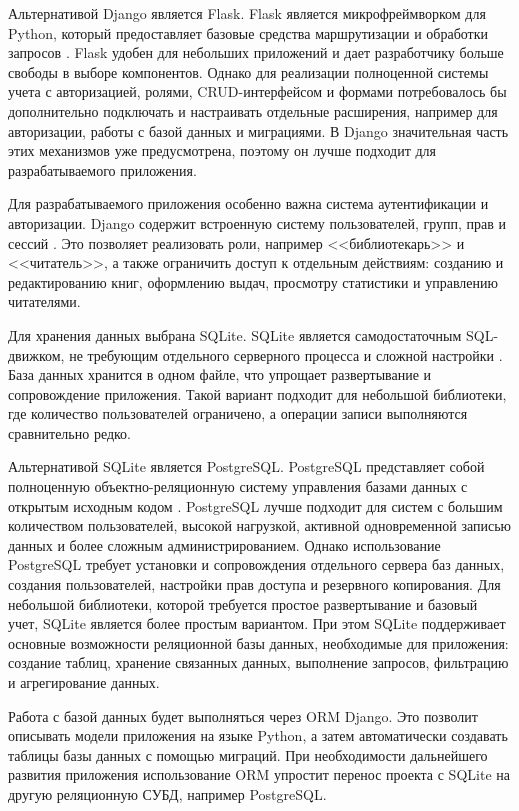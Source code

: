 Альтернативой Django является Flask. Flask является микрофреймворком для Python,
который предоставляет базовые средства маршрутизации и обработки запросов
\cite{flask_docs}. Flask удобен для небольших приложений и дает разработчику
больше свободы в выборе компонентов. Однако для реализации полноценной системы
учета с авторизацией, ролями, CRUD-интерфейсом и формами потребовалось бы
дополнительно подключать и настраивать отдельные расширения, например для
авторизации, работы с базой данных и миграциями. В Django значительная часть этих
механизмов уже предусмотрена, поэтому он лучше подходит для разрабатываемого
приложения.

Для разрабатываемого приложения особенно важна система аутентификации и
авторизации. Django содержит встроенную систему пользователей, групп, прав и
сессий \cite{django_auth}. Это позволяет реализовать роли, например
<<библиотекарь>> и <<читатель>>, а также ограничить доступ к отдельным действиям:
созданию и редактированию книг, оформлению выдач, просмотру статистики и
управлению читателями.

Для хранения данных выбрана SQLite. SQLite является самодостаточным SQL-движком,
не требующим отдельного серверного процесса и сложной настройки
\cite{sqlite_official}. База данных хранится в одном файле, что упрощает
развертывание и сопровождение приложения. Такой вариант подходит для небольшой
библиотеки, где количество пользователей ограничено, а операции записи выполняются
сравнительно редко.

Альтернативой SQLite является PostgreSQL. PostgreSQL представляет собой
полноценную объектно-реляционную систему управления базами данных с открытым
исходным кодом \cite{postgresql_official}. PostgreSQL лучше подходит для систем
с большим количеством пользователей, высокой нагрузкой, активной одновременной
записью данных и более сложным администрированием. Однако использование
PostgreSQL требует установки и сопровождения отдельного сервера баз данных,
создания пользователей, настройки прав доступа и резервного копирования. Для
небольшой библиотеки, которой требуется простое развертывание и базовый учет,
SQLite является более простым вариантом. При этом SQLite поддерживает основные
возможности реляционной базы данных, необходимые для приложения: создание таблиц,
хранение связанных данных, выполнение запросов, фильтрацию и агрегирование
данных.

Работа с базой данных будет выполняться через ORM Django. Это позволит описывать
модели приложения на языке Python, а затем автоматически создавать таблицы базы
данных с помощью миграций. При необходимости дальнейшего развития приложения
использование ORM упростит перенос проекта с SQLite на другую реляционную СУБД,
например PostgreSQL.

